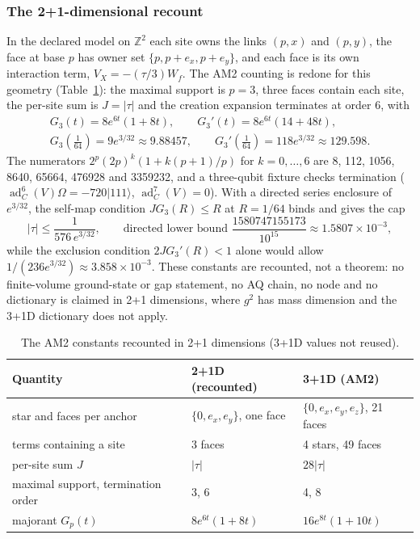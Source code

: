 \subsubsection{The 2+1-dimensional recount}
\label{sec:bd2-dimension}
In the declared model on $\mathbb Z^2$ each site owns the links $(p,x)$ and
$(p,y)$, the face at base $p$ has owner set $\{p,p+e_x,p+e_y\}$, and each face
is its own interaction term, $V_X=-(\tau/3)W_f$. The AM2 counting is redone for
this geometry (Table~\ref{tab:bd2-dimension}): the maximal support is $p=3$,
three faces contain each site, the per-site sum is $J=|\tau|$ and the
creation expansion terminates at order 6, with
\begin{equation}
 \begin{gathered}
 G_3(t)=8e^{6t}(1+8t),\qquad G_3'(t)=8e^{6t}(14+48t),\\
 G_3(\tfrac1{64})=9e^{3/32}\approx9.88457,\qquad G_3'(\tfrac1{64})=118e^{3/32}\approx129.598 .
 \end{gathered}
 \label{eq:bd2-G3}
\end{equation}
The numerators $2^p(2p)^k(1+k(p+1)/p)$ for
$k=0,\ldots,6$ are 8, 112, 1056, 8640, 65664, 476928 and 3359232, and a
three-qubit fixture checks termination
($\operatorname{ad}_C^6(V)\Omega=-720|111\rangle$, $\operatorname{ad}_C^7(V)=0$).
With a directed series enclosure of $e^{3/32}$, the self-map condition
$JG_3(R)\le R$ at $R=1/64$ binds and gives the cap
\begin{equation}
 |\tau|\le\frac1{576\,e^{3/32}},\qquad\text{directed lower bound }\frac{1580747155173}{10^{15}}\approx1.5807\times10^{-3},
 \label{eq:bd2-cap}
\end{equation}
while the exclusion condition $2JG_3'(R)<1$ alone would allow
$1/(236e^{3/32})\approx3.858\times10^{-3}$. These constants are recounted, not
a theorem: no finite-volume ground-state or gap statement, no AQ chain, no
node and no dictionary is claimed in 2+1 dimensions, where $g^2$ has mass
dimension and the 3+1D dictionary does not apply.

\begin{table}[htbp]
\centering\small
\caption{The AM2 constants recounted in 2+1 dimensions (3+1D values not
reused).}
\label{tab:bd2-dimension}
\begin{tabular}{lll}
\toprule
Quantity & 2+1D (recounted) & 3+1D (AM2)\\
\midrule
star and faces per anchor & $\{0,e_x,e_y\}$, one face & $\{0,e_x,e_y,e_z\}$, 21 faces\\
terms containing a site & 3 faces & 4 stars, 49 faces\\
per-site sum $J$ & $|\tau|$ & $28|\tau|$\\
maximal support, termination order & 3, 6 & 4, 8\\
majorant $G_p(t)$ & $8e^{6t}(1+8t)$ & $16e^{8t}(1+10t)$\\
\bottomrule
\end{tabular}
\end{table}

